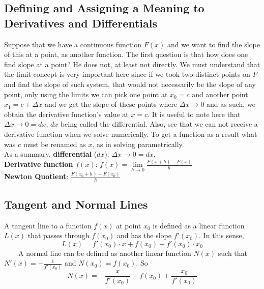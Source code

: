 \documentclass[12pt]{article}
\begin{document}
\subsection{Defining and Assigning a Meaning to Derivatives and Differentials}
Suppose that we have a continuous function $F(x)$ and we want to find the slope of this at a point, as another function. The first question is that how does one find slope at a point? He does not, at least not directly. We must understand that the limit concept is very important here since if we took two distinct points on $F$ and find the slope of such system, that would not necessarily be the slope of any point, only using the limits we can pick one point at $x_0=c$ and another point $x_1=c+\Delta x$ and we get the slope of these points where $\Delta x \to 0$ and as such, we obtain the derivative function's value at $x=c$. It is useful to note here that $\Delta x \to 0=dx$, $dx$ being called the differential. Also, see that we can not receive a derivative function when we solve numerically. To get a function as a result what was $c$ must be renamed as $x$, as in solving parametrically.\\
As a summary, \textbf{differential} ($dx$): $\Delta x \to 0=dx$.\\
\textbf{Derivative function} $f(x)$:  $\displaystyle{f(x)=\lim \limits_{h \to 0} \frac{F(x+h)-F(x)}{h}}$\\
\textbf{Newton Quotient}: $\displaystyle{\frac{F(x_0+h)-F(x_0)}{h}}$
\subsection{Tangent and Normal Lines}
A tangent line to a function $f(x)$ at point $x_0$ is defined as a linear function $L(x)$ that passes through $f(x_0)$ and has the slope $f'(x_0)$. In this sense,$$ L(x)= f'(x_0)\cdot x+f(x_0)-f'(x_0)\cdot x_0 $$\ \ \ \ 
A normal line can be defined as another linear function $N(x)$ such that $\displaystyle{N'(x)=-\frac{1}{f'(x_0)}}$ and $N(x_0)=f(x_0)$. So $$N(x)=-\frac{x}{f'(x_0)}+f(x_0)+\frac{x_0}{f'(x_0)}$$
\newpage
\end{document}
